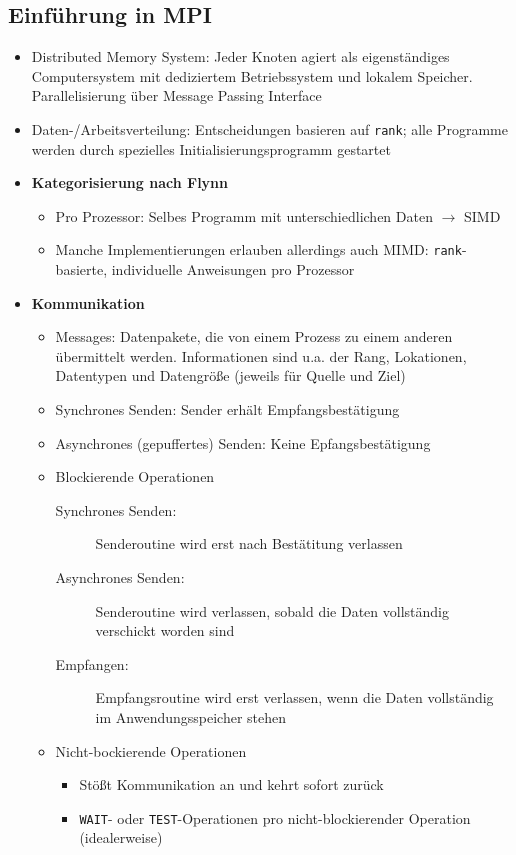 \subsection{Einführung in MPI}
\begin{itemize}
	\item Distributed Memory System: Jeder Knoten agiert als eigenständiges Computersystem mit dediziertem Betriebssystem und lokalem Speicher. Parallelisierung über Message Passing Interface
	\item Daten-/Arbeitsverteilung: Entscheidungen basieren auf \texttt{rank}; alle Programme werden durch spezielles Initialisierungsprogramm gestartet
	\item \textbf{Kategorisierung nach Flynn}
	\begin{itemize}
		\item Pro Prozessor: Selbes Programm mit unterschiedlichen Daten \(\rightarrow\) SIMD
		\item Manche Implementierungen erlauben allerdings auch MIMD: \texttt{rank}-basierte, individuelle Anweisungen pro Prozessor
	\end{itemize}
	\item \textbf{Kommunikation}
	\begin{itemize}
		\item Messages: Datenpakete, die von einem Prozess zu einem anderen übermittelt werden. Informationen sind u.a. der Rang, Lokationen, Datentypen und Datengröße (jeweils für Quelle und Ziel)
		\item Synchrones Senden: Sender erhält Empfangsbestätigung
		\item Asynchrones (gepuffertes) Senden: Keine Epfangsbestätigung
		\item Blockierende Operationen
		\begin{description}
			\item[Synchrones Senden:] Senderoutine wird erst nach Bestätitung verlassen
			\item[Asynchrones Senden:] Senderoutine wird verlassen, sobald die Daten vollständig verschickt worden sind
			\item[Empfangen:] Empfangsroutine wird erst verlassen, wenn die Daten vollständig im Anwendungsspeicher stehen
		\end{description}
		\item Nicht-bockierende Operationen
		\begin{itemize}
			\item Stößt Kommunikation an und kehrt sofort zurück
			\item \texttt{WAIT}- oder \texttt{TEST}-Operationen pro nicht-blockierender Operation (idealerweise)

\end{itemize}
\end{itemize}
\end{itemize}
